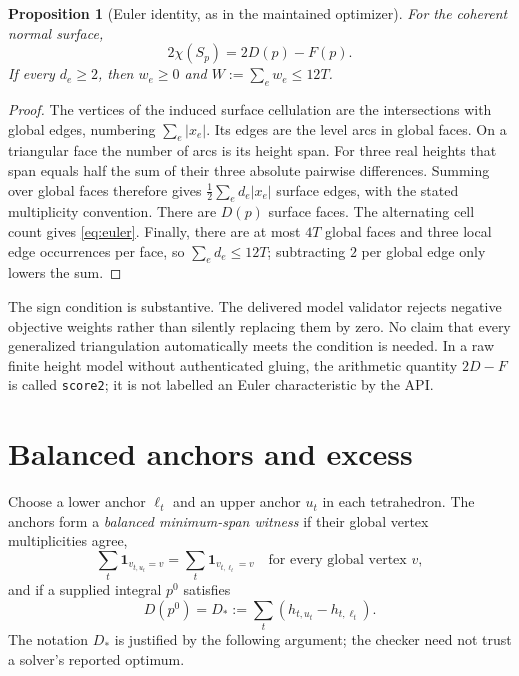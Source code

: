 \documentclass[11pt,letterpaper]{article}
\newtheorem{proposition}[theorem]{Proposition}
\theoremstyle{definition}
\begin{document}
\begin{proposition}[Euler identity, as in the maintained optimizer]\label{prop:euler}
For the coherent normal surface,
\begin{equation}\label{eq:euler}
 2\chi(S_p)=2D(p)-F(p).
\end{equation}
If every $d_e\geq2$, then $w_e\geq0$ and $W:=\sum_e w_e\leq12T$.
\end{proposition}
\begin{proof}
The vertices of the induced surface cellulation are the intersections with global edges, numbering $\sum_e|x_e|$. Its edges are the level arcs in global faces. On a triangular face the number of arcs is its height span. For three real heights that span equals half the sum of their three absolute pairwise differences. Summing over global faces therefore gives $\frac12\sum_e d_e|x_e|$ surface edges, with the stated multiplicity convention. There are $D(p)$ surface faces. The alternating cell count gives \eqref{eq:euler}. Finally, there are at most $4T$ global faces and three local edge occurrences per face, so $\sum_e d_e\leq12T$; subtracting $2$ per global edge only lowers the sum.
\end{proof}

The sign condition is substantive. The delivered model validator rejects negative objective weights rather than silently replacing them by zero. No claim that every generalized triangulation automatically meets the condition is needed. In a raw finite height model without authenticated gluing, the arithmetic quantity $2D-F$ is called \texttt{score2}; it is not labelled an Euler characteristic by the API.

\section{Balanced anchors and excess}\label{sec:anchors}
Choose a lower anchor $\ell_t$ and an upper anchor $u_t$ in each tetrahedron. The anchors form a \emph{balanced minimum-span witness} if their global vertex multiplicities agree,
\begin{equation}\label{eq:balance}
 \sum_t\mathbf1_{v_{t,u_t}=v}=\sum_t\mathbf1_{v_{t,\ell_t}=v}
 \quad\text{for every global vertex }v,
\end{equation}
and if a supplied integral $p^0$ satisfies
\begin{equation}\label{eq:dualvalue}
 D(p^0)=D_*:=\sum_t(h_{t,u_t}-h_{t,\ell_t}).
\end{equation}
The notation $D_*$ is justified by the following argument; the checker need not trust a solver's reported optimum.
\end{document}
